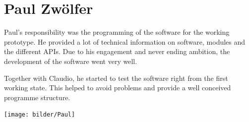 \section*{Paul Zwölfer}
Paul's responsibility was the programming of the software for the working prototype. He provided a lot of technical information on software, modules and the different APIs. Due to his engagement and never ending ambition, the development of the software went very well.

Together with Claudio, he started to test the software right from the first working state. This helped to avoid problems and provide a well conceived programme structure.
\begin{center}
\texttt{[image: bilder/Paul]}
\end{center}